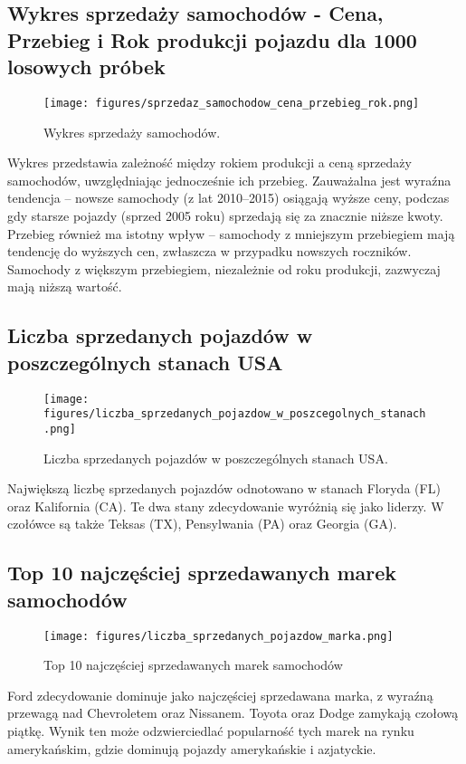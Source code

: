 \documentclass[10pt,letterpaper]{article}
\begin{document}
\subsection{Wykres sprzedaży samochodów - Cena, Przebieg i Rok produkcji pojazdu dla 1000 losowych próbek}
\begin{figure}[H]
\begin{center}
   \texttt{[image: figures/sprzedaz\_samochodow\_cena\_przebieg\_rok.png]}
   \caption{Wykres sprzedaży samochodów.}
   \label{fig:other-figure-log}
\end{center}
\end{figure}
Wykres przedstawia zależność między rokiem produkcji a ceną sprzedaży samochodów, uwzględniając jednocześnie ich przebieg. Zauważalna jest wyraźna tendencja – nowsze samochody (z lat 2010–2015) osiągają wyższe ceny, podczas gdy starsze pojazdy (sprzed 2005 roku) sprzedają się za znacznie niższe kwoty. Przebieg również ma istotny wpływ – samochody z mniejszym przebiegiem mają tendencję do wyższych cen, zwłaszcza w przypadku nowszych roczników. Samochody z większym przebiegiem, niezależnie od roku produkcji, zazwyczaj mają niższą wartość.

\subsection{Liczba sprzedanych pojazdów w poszczególnych stanach USA}
\begin{figure}[H]
\begin{center}
   \texttt{[image: figures/liczba\_sprzedanych\_pojazdow\_w\_poszcegolnych\_stanach.png]}
   \caption{Liczba sprzedanych pojazdów w poszczególnych stanach USA.}
   \label{fig:other-figure-log}
\end{center}
\end{figure}
Największą liczbę sprzedanych pojazdów odnotowano w stanach Floryda (FL) oraz Kalifornia (CA). Te dwa stany zdecydowanie wyróżnią się jako liderzy. W czołówce są także Teksas (TX), Pensylwania (PA) oraz Georgia (GA).

\subsection{Top 10 najczęściej sprzedawanych marek samochodów}
\begin{figure}[H]
\begin{center}
   \texttt{[image: figures/liczba\_sprzedanych\_pojazdow\_marka.png]}
   \caption{Top 10 najczęściej sprzedawanych marek samochodów}
   \label{fig:other-figure-log}
\end{center}
\end{figure}
Ford zdecydowanie dominuje jako najczęściej sprzedawana marka, z wyraźną przewagą nad Chevroletem oraz Nissanem. Toyota oraz Dodge zamykają czołową piątkę. Wynik ten może odzwierciedlać popularność tych marek na rynku amerykańskim, gdzie dominują pojazdy amerykańskie i azjatyckie.
\end{document}

